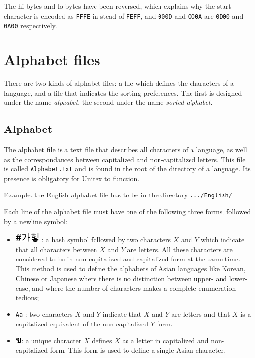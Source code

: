 \bigskip
\noindent The hi-bytes and lo-bytes have been reversed, which explains why the
start character is encoded as \verb+FFFE+ in stead of \verb+FEFF+, and
\verb+000D+ and \verb+OO0A+ are \verb+0D00+ and \verb+0A00+ respectively.



\section{Alphabet files}
There are two kinds of alphabet files: a file which defines the characters of a
language, and a file that indicates the sorting preferences. The first is
designed under the name \textit{alphabet}, the second under the name
\textit{sorted alphabet}.


\subsection{Alphabet}
The alphabet file is a text file that describes all characters of a language, as
well as the correspondances between capitalized and non-capitalized letters. This
file is called \verb+Alphabet.txt+  and is found
in the root of the directory of a language. Its presence is obligatory for Unitex
to function.

\bigskip
\noindent Example: the English alphabet file has to be in the directory
\verb+.../English/+

\bigskip
\noindent Each line of the alphabet file must have one of the following
three forms, followed by a newline symbol:

\begin{itemize}
  \item \includegraphics[height=0.5cm]{resources/img/korean_letters.png} : a
  hash symbol followed by two characters $X$ and $Y$ which indicate that all characters between $X$ and $Y$
  are letters. All these characters are considered to be in non-capitalized and
  capitalized form at the same time. This method is used to define the alphabets
  of Asian languages like Korean, Chinese or Japanese where there is no
  distinction between upper- and lower-case, and where the number of characters
  makes a complete enumeration tedious;

  \item \verb+Aa+ : two characters $X$ and $Y$ indicate that $X$ and $Y$ are
  letters and that $X$ is a capitalized equivalent of the non-capitalized $Y$
  form.

  \item \includegraphics[height=0.3cm]{resources/img/thai_letter.png}: a unique
  character $X$ defines $X$ as a letter in capitalized and non-capitalized form. This form is used to define a
  single Asian character.
\end{itemize}

